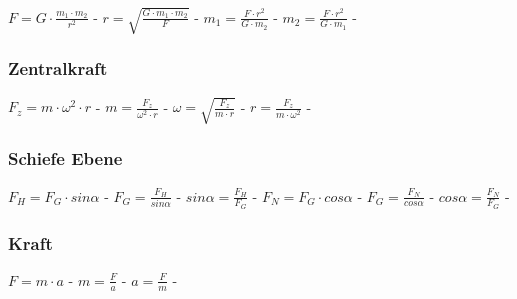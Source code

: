 $ F = G \cdot  \frac{m_{1} \cdot m_{2} }{  r^{2} } $ - $ r = \sqrt{\frac{G\cdot m_{1} \cdot m_{2} }{   F}} $ - $ m_{1}  =  \frac{F\cdot r^{2} }{G\cdot m_{2} } $ - $ m_{2}  =  \frac{F\cdot r^{2} }{G\cdot m_{1} } $ - \\ 
 
\subsubsection{Zentralkraft} 
\begin{minipage}{0.45\textwidth} 
\end{minipage} 
\begin{minipage}{0.45\textwidth} 
 
\legende{}\end{minipage} 
 
$ F_{z}  = m\cdot \omega ^{2} \cdot r $ - $ m = \frac{ F_{z} }{\omega ^{2} \cdot r} $ - $ \omega  = \sqrt{\frac{ F_{z} }{m\cdot r}} $ - $ r = \frac{ F_{z} }{m\cdot \omega ^{2} } $ - \\ 
 
\subsubsection{Schiefe Ebene} 
\begin{minipage}{0.45\textwidth} 
\end{minipage} 
\begin{minipage}{0.45\textwidth} 
 
\legende{}\end{minipage} 
 
$ F_{H}  = F_{G} \cdot sin \alpha $ - $ F_{G}  = \frac{ F_{H} }{sin \alpha } $ - $ sin \alpha  = \frac{F_{H} }{F_{G} } $ - $ F_{N}  = F_{G} \cdot cos \alpha $ - $ F_{G}  = \frac{ F_{N} }{cos \alpha } $ - $ cos \alpha  = \frac{F_{N} }{F_{G} } $ - \\ 
 
\subsubsection{Kraft} 
\begin{minipage}{0.45\textwidth} 
\end{minipage} 
\begin{minipage}{0.45\textwidth} 
 
\legende{}\end{minipage} 
 
$ F = m\cdot a $ - $ m = \frac{F}{a} $ - $ a = \frac{F}{m} $ - \\ 
 
